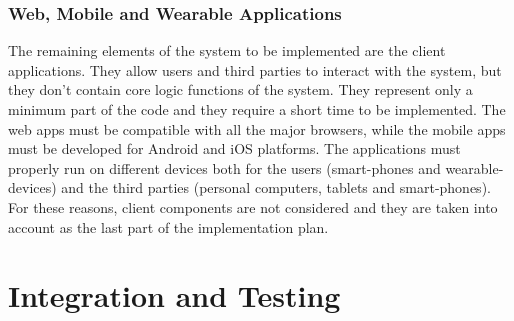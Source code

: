 \subsubsection{Web, Mobile and Wearable Applications}
The remaining elements of the system to be implemented are the client applications. They allow users and third parties to interact with the system, but they don't contain core logic functions of the system.
They represent only a minimum part of the code and they require a short time to be implemented. 
The web apps must be compatible with all the major browsers, while the mobile apps must be developed for Android and iOS platforms.
The applications must properly run on different devices both for the users (smart-phones and wearable-devices) and the third parties (personal computers, tablets and smart-phones).\\
For these reasons, client components are not considered  and they are taken into account as the last part of the implementation plan.

\clearpage
\section{Integration and Testing}
